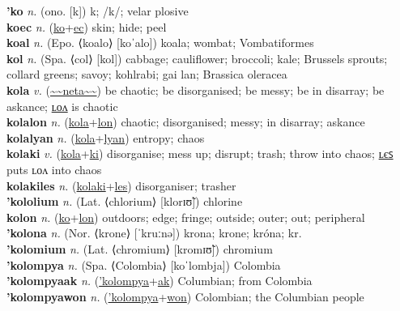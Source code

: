 \textbf{'ko} \textit{n.} (ono. [k])
k; /k/; velar plosive \label{'ko} \\
\textbf{koec} \textit{n.} (\hyperref[ko]{ko}+\hyperref[ec]{ec})
skin; hide; peel \label{koec} \\
\textbf{koal} \textit{n.} (Epo. ⟨koalo⟩ [koˈalo])
koala; wombat; Vombatiformes \label{koal} \\
\textbf{kol} \textit{n.} (Spa. ⟨col⟩ [kol])
cabbage; cauliflower; broccoli; kale; Brussels sprouts; collard greens; savoy; kohlrabi; gai lan; Brassica oleracea \label{kol} \\
\textbf{kola} \textit{v.} (\hyperref[neta]{\~{}\~{}neta\~{}\~{}})
be chaotic; be disorganised; be messy; be in disarray; be askance; \hyperref[kolalon]{ʟᴏᴧ} is chaotic \label{kola} \\
\textbf{kolalon} \textit{n.} (\hyperref[kola]{kola}+\hyperref[lon]{lon})
chaotic; disorganised; messy; in disarray; askance \label{kolalon} \\
\textbf{kolalyan} \textit{n.} (\hyperref[kola]{kola}+\hyperref[lyan]{lyan})
entropy; chaos \label{kolalyan} \\
\textbf{kolaki} \textit{v.} (\hyperref[kola]{kola}+\hyperref[ki]{ki})
disorganise; mess up; disrupt; trash; throw into chaos; \hyperref[kolakiles]{ʟєꜱ} puts ʟᴏᴧ into chaos \label{kolaki} \\
\textbf{kolakiles} \textit{n.} (\hyperref[kolaki]{kolaki}+\hyperref[les]{les})
disorganiser; trasher \label{kolakiles} \\
\textbf{'kololium} \textit{n.} (Lat. ⟨chlorium⟩ [klorɪʊ̃])
chlorine \label{'kololium} \\
\textbf{kolon} \textit{n.} (\hyperref[ko]{ko}+\hyperref[lon]{lon})
outdoors; edge; fringe; outside; outer; out; peripheral \label{kolon} \\
\textbf{'kolona} \textit{n.} (Nor. ⟨krone⟩ [ˈkruːnə])
krona; krone; króna; kr. \label{'kolona} \\
\textbf{'kolomium} \textit{n.} (Lat. ⟨chromium⟩ [kromɪʊ̃])
chromium \label{'kolomium} \\
\textbf{'kolompya} \textit{n.} (Spa. ⟨Colombia⟩ [koˈlombja])
Colombia \label{'kolompya} \\
\textbf{'kolompyaak} \textit{n.} (\hyperref['kolompya]{'kolompya}+\hyperref[ak]{ak})
Columbian; from Colombia \label{'kolompyaak} \\
\textbf{'kolompyawon} \textit{n.} (\hyperref['kolompya]{'kolompya}+\hyperref[won]{won})
Colombian; the Columbian people \label{'kolompyawon} \\
